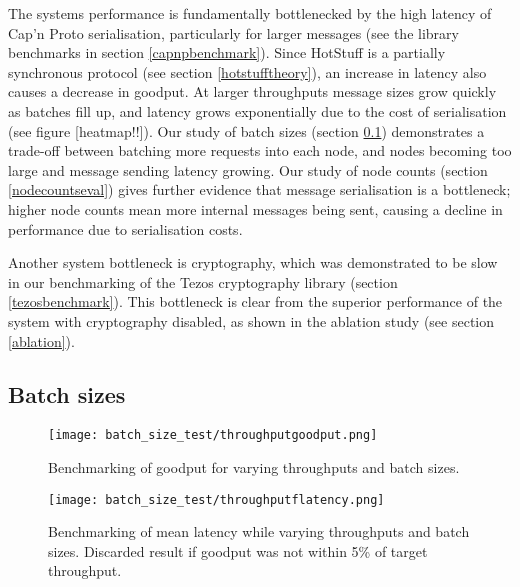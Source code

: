 The systems performance is fundamentally bottlenecked by the high latency of Cap'n Proto serialisation, particularly for larger messages (see the library benchmarks in section \ref{capnpbenchmark}). Since HotStuff is a partially synchronous protocol (see section \ref{hotstufftheory}), an increase in latency also causes a decrease in goodput. At larger throughputs message sizes grow quickly as batches fill up, and latency grows exponentially due to the cost of serialisation (see figure [heatmap!!]). Our study of batch sizes (section \ref{batchsizeseval}) demonstrates a trade-off between batching more requests into each node, and nodes becoming too large and message sending latency growing. Our study of node counts (section \ref{nodecountseval}) gives further evidence that message serialisation is a bottleneck; higher node counts mean more internal messages being sent, causing a decline in performance due to serialisation costs.

Another system bottleneck is cryptography, which was demonstrated to be slow in our benchmarking of the Tezos cryptography library (section \ref{tezosbenchmark}). This bottleneck is clear from the superior performance of the system with cryptography disabled, as shown in the ablation study (see section \ref{ablation}).
\subsection{Batch sizes} \label{batchsizeseval}

\begin{figure}[h!]
\centering
\texttt{[image: batch\_size\_test/throughputgoodput.png]}
\caption{Benchmarking of goodput for varying throughputs and batch sizes.}
\label{throughputgoodputbatch}
\end{figure}

\begin{figure}[h!]
\centering
\texttt{[image: batch\_size\_test/throughputflatency.png]}
\caption{Benchmarking of mean latency while varying throughputs and batch sizes. Discarded result if goodput was not within 5\% of target throughput.}
\label{throughputlatencybatch}
\end{figure}

